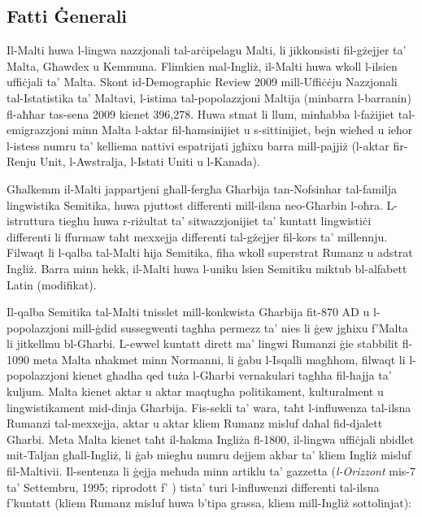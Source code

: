 \clearpage



\begin{multicols}{2}

\subsection{Fatti Ġenerali}

Il-Malti huwa l-lingwa nazzjonali tal-arċipelagu Malti, li jikkonsisti fil-gżejjer ta’ Malta, Għawdex u Kemmuna.
Flimkien mal-Ingliż, il-Malti huwa wkoll l-ilsien uffiċjali ta’ Malta. Skont id-Demographic Review 2009 mill-Uffiċċju Nazzjonali tal-Istatistika ta’ Maltavi, l-istima tal-popolazzjoni Maltija (minbarra l-barranin) fl-aħħar tas-sena 2009 kienet 396,278. Huwa stmat li llum, minħabba l-fażijiet tal-emigrazzjoni minn Malta l-aktar fil-ħamsinijiet u s-sittinijiet, bejn wieħed u ieħor l-istess numru ta’ kelliema nattivi espatrijati jgħixu barra mill-pajjiż (l-aktar fir-Renju Unit, l-Awstralja, l-Istati Uniti u l-Kanada).
    
Għalkemm il-Malti jappartjeni għall-fergħa Għarbija tan-Nofsinhar tal-familja lingwistika Semitika, huwa pjuttost differenti mill-ilsna neo-Għarbin l-oħra. L-istruttura tiegħu huwa r-riżultat ta’ sitwazzjonijiet ta’ kuntatt lingwistiċi differenti li ffurmaw taħt mexxejja differenti tal-gżejjer fil-kors ta' millennju. Filwaqt li l-qalba tal-Malti hija Semitika, fiha wkoll superstrat Rumanz u adstrat Ingliż. Barra minn hekk, il-Malti huwa l-uniku lsien Semitiku miktub bl-alfabett Latin (modifikat).
    
Il-qalba Semitika tal-Malti tnisslet mill-konkwista Għarbija fit-870 AD u l-popolazzjoni mill-ġdid sussegwenti tagħha permezz ta’ nies li ġew jgħixu f’Malta li jitkellmu bl-Għarbi. L-ewwel kuntatt dirett ma’ lingwi Rumanzi ġie stabbilit fl-1090 meta Malta nħakmet minn Normanni, li ġabu l-Isqalli magħhom, filwaqt li l-popolazzjoni kienet għadha qed tuża l-Għarbi vernakulari tagħha fil-ħajja ta’ kuljum. Malta kienet aktar u aktar maqtugħa politikament, kulturalment u lingwistikament mid-dinja Għarbija. Fis-sekli ta’ wara, taħt l-influwenza tal-ilsna Rumanzi tal-mexxejja, aktar u aktar kliem Rumanz misluf daħal fid-djalett Għarbi. Meta Malta kienet taħt il-ħakma Ingliża fl-1800, il-lingwa uffiċjali nbidlet mit-Taljan għall-Ingliż, li ġab miegħu numru dejjem akbar ta’ kliem Ingliż misluf fil-Maltivii. Il-sentenza li ġejja meħuda minn artiklu ta’ gazzetta (\emph{l-Orizzont} mis-7 ta’ Settembru, 1995; riprodott f’ \cite[p.~135]{Ambros:1998}) tista’ turi l-influwenzi differenti tal-ilsna f'kuntatt (kliem Rumanz misluf huwa b’tipa grassa, kliem mill-Ingliż sottolinjat):


\end{multicols}
